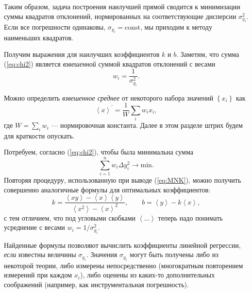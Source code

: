 \documentclass[10pt]{article}
\begin{document}
{\small{}Таким образом, задача построения наилучшей прямой сводится
к минимизации суммы квадратов отклонений, нормированных на соответствующие
дисперсии $\sigma_{y_{i}}^{2}$. Если все погрешности одинаковы, $\sigma_{y_{i}}=\mathrm{const}$,
мы приходим к методу наименьших квадратов.}{\small\par}

{\small{}Получим выражения для наилучших коэффициентов $k$ и $b$.
Заметим, что сумма (\ref{eq:chi2}) является }\emph{\small{}взвешенной}{\small{}
суммой квадратов отклонений с весами
\begin{equation}
w_{i}=\frac{1}{\sigma_{y_{i}}^{2}}.
\end{equation}
}{\small\par}

{\small{}Можно определить }\emph{\small{}взвешенное среднее }{\small{}от
некоторого набора значений $\left\{ x_{i}\right\} $ как
\[
\left\langle x\right\rangle ^{\prime}=\frac{1}{W}\sum_{i}w_{i}x_{i},
\]
где $W=\sum\limits _{i}w_{i}$ --- нормировочная константа.
Далее в этом разделе штрих будем для краткости опускать.}{\small\par}

{\small{}Потребуем, согласно (\ref{eq:chi2}), чтобы была минимальна
сумма
\[
\sum\limits _{i=1}^{n}w_{i}\Delta y_{i}^{2}\to\mathrm{min}.
\]
Повторяя процедуру, использованную при выводе (\ref{eq:MNK}), можно
получить совершенно аналогичные формулы для оптимальных коэффициентов:
\begin{equation}
\boxed{k=\frac{\left\langle xy\right\rangle -\left\langle x\right\rangle \left\langle y\right\rangle }{\left\langle x^{2}\right\rangle -\left\langle x\right\rangle ^{2}},\qquad b=\left\langle y\right\rangle -k\left\langle x\right\rangle },\label{eq:MMP}
\end{equation}
с тем отличием, что под угловыми скобками $\left\langle \ldots\right\rangle $
теперь надо понимать усреднение с весами $w_{i}=1/\sigma_{y_{i}}^{2}$.}{\small\par}

{\small{}Найденные формулы позволяют вычислить коэффициенты линейной
регрессии, }\emph{\small{}если}{\small{} известны величины $\sigma_{y_{i}}$.
Значения $\sigma_{y_{i}}$ могут быть получены либо из некоторой теории,
либо измерены непосредственно (многократным повторением измерений
при каждом $x_{i}$), либо оценены из каких-то дополнительных соображений
(например, как инструментальная погрешность).}{\small\par}
\end{document}
